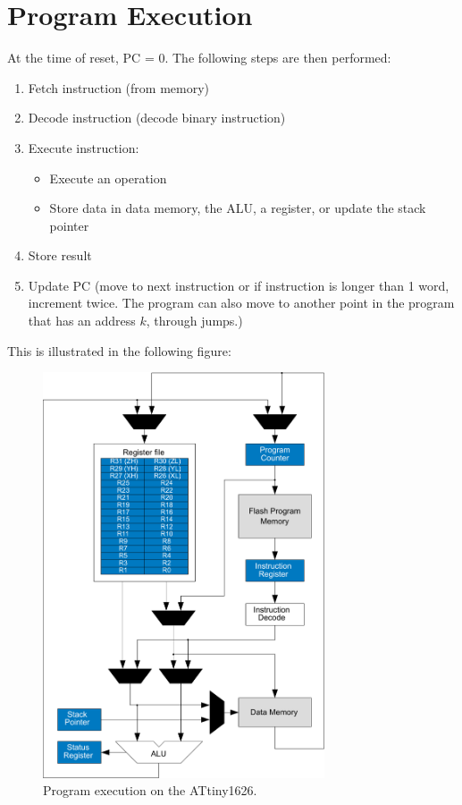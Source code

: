 \documentclass{report}
\begin{document}
\section{Program Execution}
At the time of reset, PC = 0. The following steps are then performed:
\begin{enumerate}
    \item Fetch instruction (from memory)
    \item Decode instruction (decode binary instruction)
    \item Execute instruction:
          \begin{itemize}
              \item Execute an operation
              \item Store data in data memory, the ALU, a register, or update the stack pointer
          \end{itemize}
    \item Store result
    \item Update PC (move to next instruction or if instruction is longer than 1 word, increment twice. The program can also move to another point in the program that has an address \(k\), through jumps.)
\end{enumerate}
This is illustrated in the following figure:
\begin{figure}[H]
    \centering
    \includegraphics[height = 12cm, keepaspectratio = true]{figures/AVR_CPU.pdf}
    \caption{Program execution on the ATtiny1626.} %
\end{figure}
\end{document}
